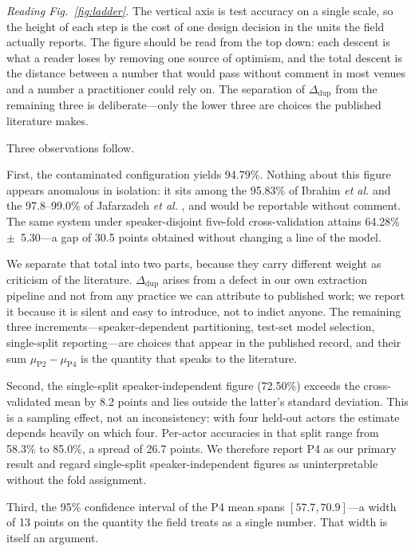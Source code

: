 \documentclass[journal,onecolumn,11pt,draftclsnofoot]{IEEEtran}   %
\begin{document}
\emph{Reading Fig.~\ref{fig:ladder}.} The vertical axis is test accuracy on a
single scale, so the height of each step is the cost of one design decision in
the units the field actually reports. The figure should be read from the top
down: each descent is what a reader loses by removing one source of optimism,
and the total descent is the distance between a number that would pass without
comment in most venues and a number a practitioner could rely on. The separation
of $\Delta_{\mathrm{dup}}$ from the remaining three is deliberate---only the
lower three are choices the published literature makes.

Three observations follow.

First, the contaminated configuration yields 94.79\%. Nothing about this figure
appears anomalous in isolation: it sits among the 95.83\% of Ibrahim \emph{et
al.} \cite{ibrahim2026multimodal} and the 97.8--99.0\% of Jafarzadeh \emph{et
al.} \cite{jafarzadeh2024ssl}, and would be reportable without comment. The same
system under speaker-disjoint five-fold cross-validation attains
64.28\%~$\pm$~5.30---a gap of 30.5 points obtained without changing a line of
the model.

We separate that total into two parts, because they carry different weight as
criticism of the literature. $\Delta_{\mathrm{dup}}$ arises from a defect in our
own extraction pipeline and not from any practice we can attribute to published
work; we report it because it is silent and easy to introduce, not to indict
anyone. The remaining three increments---speaker-dependent partitioning,
test-set model selection, single-split reporting---are choices that appear in
the published record, and their sum $\mu_{\mathrm{P2}}-\mu_{\mathrm{P4}}$ is the
quantity that speaks to the literature.

Second, the single-split speaker-independent figure (72.50\%) exceeds the
cross-validated mean by 8.2 points and lies outside the latter's standard
deviation. This is a sampling effect, not an inconsistency: with four held-out
actors the estimate depends heavily on which four. Per-actor accuracies in that
split range from 58.3\% to 85.0\%, a spread of 26.7 points. We therefore report
P4 as our primary result and regard single-split speaker-independent figures as
uninterpretable without the fold assignment.

Third, the 95\% confidence interval of the P4 mean spans $[57.7, 70.9]$---a
width of 13 points on the quantity the field treats as a single number. That
width is itself an argument.
\end{document}
